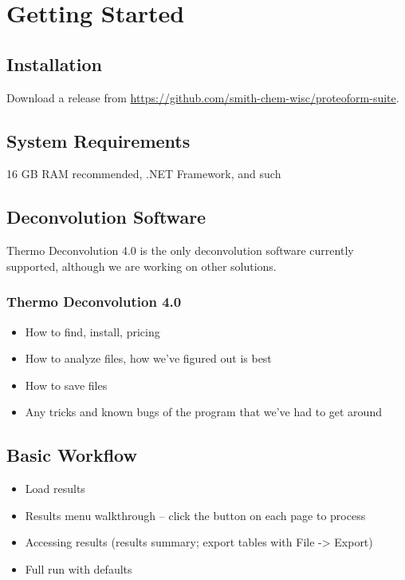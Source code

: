
\section{Getting Started}
\subsection{Installation}
Download a release from \url{https://github.com/smith-chem-wisc/proteoform-suite}.

\subsection{System Requirements}
16 GB RAM recommended, .NET Framework, and such

\subsection{Deconvolution Software}
Thermo Deconvolution 4.0 is the only deconvolution software currently supported, although we are working on other solutions.

\subsubsection{Thermo Deconvolution 4.0}
\begin{itemize}
	\item How to find, install, pricing
	\item How to analyze files, how we've figured out is best
	\item How to save files
	\item Any tricks and known bugs of the program that we've had to get around
\end{itemize}

\subsection{Basic Workflow}
\begin{itemize}
	\item Load results
	\item Results menu walkthrough -- click the button on each page to process
	\item Accessing results (results summary; export tables with File -> Export)
	\item Full run with defaults
\end{itemize}

